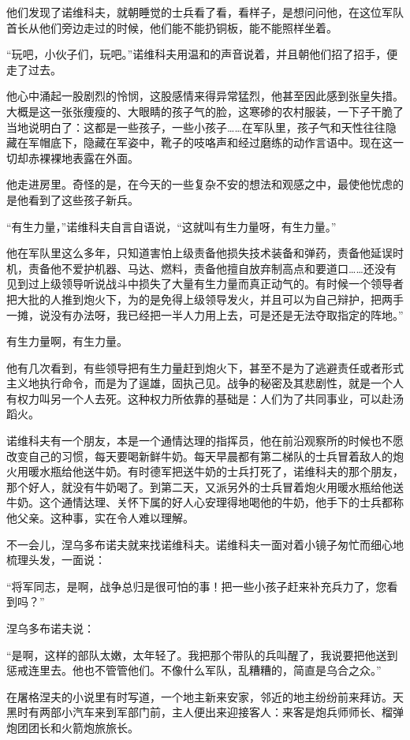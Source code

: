 他们发现了诺维科夫，就朝睡觉的士兵看了看，看样子，是想问问他，在这位军队首长从他们旁边走过的时候，他们能不能扔铜板，能不能照样坐着。

“玩吧，小伙子们，玩吧。”诺维科夫用温和的声音说着，并且朝他们招了招手，便走了过去。

他心中涌起一股剧烈的怜悯，这股感情来得异常猛烈，他甚至因此感到张皇失措。大概是这一张张痩瘦的、大眼睛的孩子气的脸，这寒碜的农村服装，一下子干脆了当地说明白了：这都是一些孩子，一些小孩子……在军队里，孩子气和天性往往隐藏在军帽底下，隐藏在军姿中，靴子的吱咯声和经过磨练的动作言语中。现在这一切却赤裸裸地表露在外面。

他走进房里。奇怪的是，在今天的一些复杂不安的想法和观感之中，最使他忧虑的是他看到了这些孩子新兵。

“有生力量，”诺维科夫自言自语说，“这就叫有生力量呀，有生力量。”

他在军队里这么多年，只知道害怕上级责备他损失技术装备和弹药，责备他延误时机，责备他不爱护机器、马达、燃料，责备他擅自放弃制高点和要道口……还没有见到过上级领导听说战斗中损失了大量有生力量而真正动气的。有时候一个领导者把大批的人推到炮火下，为的是免得上级领导发火，并且可以为自己辩护，把两手一摊，说没有办法呀，我已经把一半人力用上去，可是还是无法夺取指定的阵地。”

有生力量啊，有生力量。

他有几次看到，有些领导把有生力量赶到炮火下，甚至不是为了逃避责任或者形式主义地执行命令，而是为了逞雄，固执己见。战争的秘密及其悲剧性，就是一个人有权力叫另一个人去死。这种权力所依靠的基础是：人们为了共同事业，可以赴汤蹈火。

诺维科夫有一个朋友，本是一个通情达理的指挥员，他在前沿观察所的时候也不愿改变自己的习惯，每天要喝新鲜牛奶。每天早晨都有第二梯队的士兵冒着敌人的炮火用暖水瓶给他送牛奶。有时德军把送牛奶的士兵打死了，诺维科夫的那个朋友，那个好人，就没有牛奶喝了。到第二天，又派另外的士兵冒着炮火用暖水瓶给他送牛奶。这个通情达理、关怀下属的好人心安理得地喝他的牛奶，他手下的士兵都称他父亲。这种事，实在令人难以理解。

不一会儿，涅乌多布诺夫就来找诺维科夫。诺维科夫一面对着小镜子匆忙而细心地梳理头发，一面说：

“将军同志，是啊，战争总归是很可怕的事！把一些小孩子赶来补充兵力了，您看到吗？”

涅乌多布诺夫说：

“是啊，这样的部队太嫩，太年轻了。我把那个带队的兵叫醒了，我说要把他送到惩戒连里去。他也不管管他们。不像什么军队，乱糟糟的，简直是乌合之众。”

在屠格涅夫的小说里有时写道，一个地主新来安家，邻近的地主纷纷前来拜访。天黑时有两部小汽车来到军部门前，主人便出来迎接客人：来客是炮兵师师长、榴弹炮团团长和火箭炮旅旅长。

